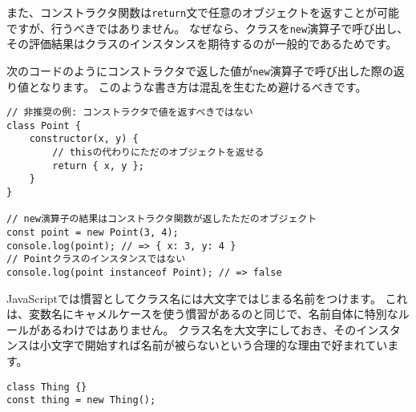 また、コンストラクタ関数は\texttt{return}文で任意のオブジェクトを返すことが可能ですが、行うべきではありません。
なぜなら、クラスを\texttt{new}演算子で呼び出し、その評価結果はクラスのインスタンスを期待するのが一般的であるためです。

次のコードのようにコンストラクタで返した値が\texttt{new}演算子で呼び出した際の返り値となります。
このような書き方は混乱を生むため避けるべきです。

\begin{lstlisting}
// 非推奨の例: コンストラクタで値を返すべきではない
class Point {
    constructor(x, y) {
        // thisの代わりにただのオブジェクトを返せる
        return { x, y };
    }
}

// new演算子の結果はコンストラクタ関数が返したただのオブジェクト
const point = new Point(3, 4);
console.log(point); // => { x: 3, y: 4 }
// Pointクラスのインスタンスではない
console.log(point instanceof Point); // => false
\end{lstlisting}

\begin{note}{}
\hypertarget{class-name-start-upper-case}{%
\underline{}\label{class-name-start-upper-case}}

JavaScriptでは慣習としてクラス名には大文字ではじまる名前をつけます。
これは、変数名にキャメルケースを使う慣習があるのと同じで、名前自体に特別なルールがあるわけではありません。
クラス名を大文字にしておき、そのインスタンスは小文字で開始すれば名前が被らないという合理的な理由で好まれています。

\begin{lstlisting}
class Thing {}
const thing = new Thing();
\end{lstlisting}
\end{note}

